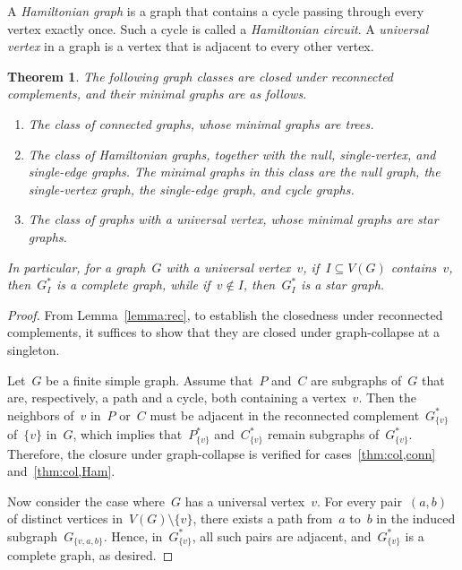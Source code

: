 \documentclass[10pt]{amsart}
\theoremstyle{plain}
\newtheorem{theorem}{Theorem}[section]
\numberwithin{equation}{section}
\theoremstyle{definition}
\begin{document}
A \emph{Hamiltonian graph} is a graph that contains a cycle passing through every vertex exactly once. Such a cycle is called a \emph{Hamiltonian circuit}. 
A \emph{universal vertex} in a graph is a vertex that is adjacent to every other vertex.


\begin{theorem}\label{thm:col}
    The following graph classes are closed under reconnected complements, and their minimal graphs are as follows.
    \begin{enumerate}
        \item\label{thm:col,conn} The class of connected graphs, whose minimal graphs are trees.
        \item\label{thm:col,Ham} The class of Hamiltonian graphs, together with the null, single-vertex, and single-edge graphs. The minimal graphs in this class are the null graph, the single-vertex graph, the single-edge graph, and cycle graphs.
        \item\label{thm:col,uni} The class of graphs with a universal vertex, whose minimal graphs are star graphs.
    \end{enumerate}
    In particular, for a graph~$G$ with a universal vertex~$v$, if~$I \subseteq V(G)$ contains~$v$, then~$G^\ast_I$ is a complete graph, while if~$v \notin I$, then~$G^\ast_I$ is a star graph.
\end{theorem}
\begin{proof}
    From Lemma~\ref{lemma:rec}, to establish the closedness under reconnected complements, it suffices to show that they are closed under graph-collapse at a singleton.
    
    Let~$G$ be a finite simple graph.
    Assume that~$P$ and~$C$ are subgraphs of~$G$ that are, respectively, a path and a cycle, both containing a vertex~$v$.
    Then the neighbors of~$v$ in~$P$ or~$C$ must be adjacent in the reconnected complement~$G^\ast_{\{v\}}$ of~$\{v\}$ in~$G$, which implies that~$P^\ast_{\{v\}}$ and~$C^\ast_{\{v\}}$ remain subgraphs of~$G^\ast_{\{v\}}$.
    Therefore, the closure under graph-collapse is verified for cases~\eqref{thm:col,conn} and~\eqref{thm:col,Ham}.
        
    Now consider the case where~$G$ has a universal vertex~$v$.
    For every pair~$(a, b)$ of distinct vertices in~$V(G) \setminus \{v\}$, there exists a path from~$a$ to~$b$ in the induced subgraph~$G_{\{v,a,b\}}$.
    Hence, in~$G^\ast_{\{v\}}$, all such pairs are adjacent, and~$G^\ast_{\{v\}}$ is a complete graph, as desired.
\end{proof}
\end{document}
